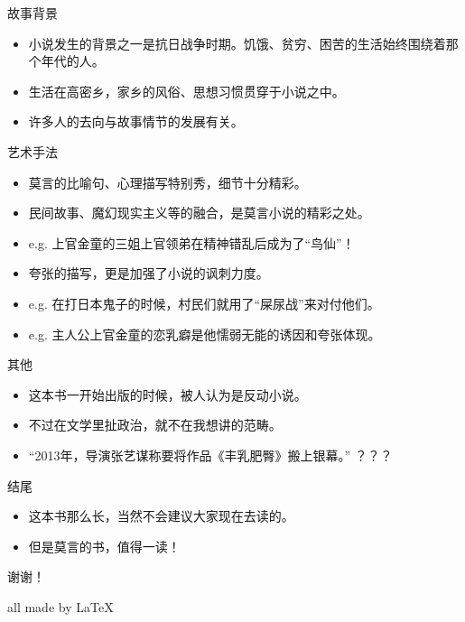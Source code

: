 \documentclass[utf-8]{beamer}
\begin{document}
    \begin{frame}{故事背景}
        \begin{itemize}
          \pause
          \item 小说发生的背景之一是抗日战争时期。饥饿、贫穷、困苦的生活始终围绕着那个年代的人。%
          \pause
          \item 生活在高密乡，家乡的风俗、思想习惯贯穿于小说之中。
          \pause
          \item 许多人的去向与故事情节的发展有关。
        \end{itemize}
    \end{frame}
    \begin{frame}{艺术手法}
        \begin{itemize}
            \pause
            \item 莫言的比喻句、心理描写特别秀，细节十分精彩。%
            \pause
            \item 民间故事、魔幻现实主义等的融合，是莫言小说的精彩之处。
            \pause
            \item e.g. 上官金童的三姐上官领弟在精神错乱后成为了“鸟仙”！
            \pause
            \item 夸张的描写，更是加强了小说的讽刺力度。
            \pause
            \item e.g. 在打日本鬼子的时候，村民们就用了“屎尿战”来对付他们。
            \pause
            \item e.g. 主人公上官金童的恋乳癖是他懦弱无能的诱因和夸张体现。
        \end{itemize}
    \end{frame}
    \begin{frame}{其他}
        \pause
        \begin{itemize}
            \item 这本书一开始出版的时候，被人认为是反动小说。%
            \pause
            \item 不过在文学里扯政治，就不在我想讲的范畴。
            \pause
            \item “2013年，导演张艺谋称要将作品《丰乳肥臀》搬上银幕。” ？？？%
        \end{itemize}
    \end{frame}
    \begin{section}{结尾}
        \begin{frame}
            \pause
            \begin{itemize}
              \item 这本书那么长，当然不会建议大家现在去读的。
              \pause
              \item 但是莫言的书，值得一读！
            \end{itemize}
            \pause
            \begin{center}\huge
                谢谢！
            \end{center}
            \pause
            \begin{flushright}
                all made by \LaTeX
            \end{flushright}
        \end{frame}
    \end{section}
\end{document}
